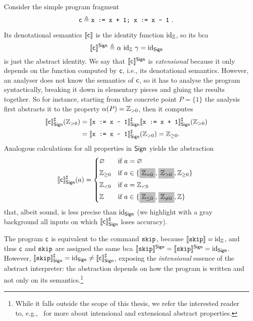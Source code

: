 \begin{example}
	Consider the simple program fragment 
	$$\regc \eqdef \code{x := x + 1; x := x - 1}\ .$$
	
	Its denotational semantics $\llbracket\mathsf{c}\rrbracket$ is the identity function $\text{id}_{\mathbb{Z}}$, so its bca $$\llbracket\mathsf{c}\rrbracket^{\mathsf{Sign}} \triangleq \alpha~\text{id}_{\mathbb{Z}}~\gamma = \text{id}_{\mathsf{Sign}}$$
	is just the abstract identity. We say that $\llbracket\mathsf{c}\rrbracket^{\mathsf{Sign}}$ is \emph{extensional} because it only depends on the function computed by $\mathsf{c}$, i.e., its denotational semantics. However, an analyser does not know the semantics of $\mathsf{c}$, so it has to analyse the program syntactically, breaking it down in elementary pieces and gluing the results together. So for instance, starting from the concrete point $P = \{ 1 \}$ the analysis first abstracts it to the property $\alpha(P) = \mathbb{Z}_{> 0}$, then it computes
	\begin{align*}
		\llbracket\mathsf{c}\rrbracket^{\sharp}_{\mathsf{Sign}} (\mathbb{Z}_{> 0}) &= \llbracket\texttt{x := x - 1}\rrbracket^{\sharp}_{\mathsf{Sign}} \llbracket\texttt{x := x + 1}\rrbracket^{\sharp}_{\mathsf{Sign}} (\mathbb{Z}_{> 0}) \\
		&= \llbracket\texttt{x := x - 1}\rrbracket^{\sharp}_{\mathsf{Sign}} (\mathbb{Z}_{> 0}) = \mathbb{Z}_{\ge 0} .
	\end{align*}
	Analogous calculations for all properties in $\mathsf{Sign}$ yields the abstraction
	\[
	\denot{\regc}^{\sharp}_{\Sign}(a) = \begin{cases*}
		\varnothing & if $a = \varnothing$ \\
		\setZ_{\ge 0} & if $a \in \{ \colorbox{lightgray}{$\setZ_{= 0}$}, \colorbox{lightgray}{$\setZ_{> 0}$}, \setZ_{\ge 0} \}$ \\
		\setZ_{< 0} & if $a = \setZ_{< 0}$ \\
		\setZ & if $a \in \{ \colorbox{lightgray}{$\setZ_{\le 0}$}, \colorbox{lightgray}{$\setZ_{\neq 0}$}, \setZ \}$ 
	\end{cases*}
	\]
	that, albeit sound, is less precise than $\text{id}_{\mathsf{Sign}}$ (we highlight with a gray background all inputs on which $\llbracket\mathsf{c}\rrbracket^{\sharp}_{\mathsf{Sign}}$ loses accuracy). 
	
	The program $\mathsf{c}$ is equivalent to the command $\texttt{skip}$, because $\llbracket\texttt{skip}\rrbracket=\text{id}_{\mathbb{Z}}$, and thus $\mathsf{c}$ and $\texttt{skip}$ are assigned the same bca $\llbracket\texttt{skip}\rrbracket^{\mathsf{Sign}} = \llbracket\texttt{skip}\rrbracket^{\mathsf{Sign}} =  \text{id}_{\mathsf{Sign}}$.
	However, $\llbracket\texttt{skip}\rrbracket^{\sharp}_{\mathsf{Sign}} = \text{id}_{\mathsf{Sign}} \neq \llbracket\mathsf{c}\rrbracket^{\sharp}_{\mathsf{Sign}}$, exposing the \emph{intensional} essence of the abstract interpreter: the abstraction depends on how the program is written and not only on its semantics.\footnote{While it falls outside the scope of this thesis, we refer the interested reader to, e.g.,~\cite{BGGGP19,BRZ22} for more about intensional and extensional abstract properties.}
\end{example}

